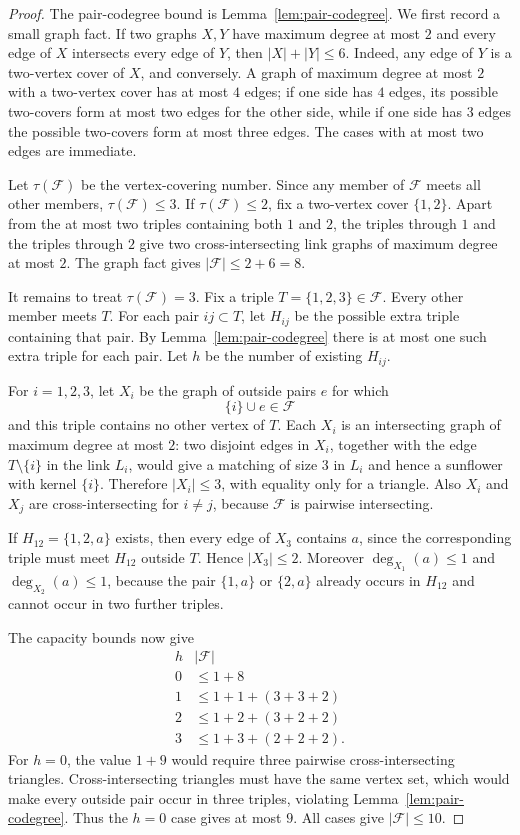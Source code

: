 \documentclass[11pt]{article}
\newcommand{\F}{\mathcal F}
\begin{document}
\begin{proof}
The pair-codegree bound is Lemma~\ref{lem:pair-codegree}.  We first record a
small graph fact.  If two graphs $X,Y$ have maximum degree at most $2$ and
every edge of $X$ intersects every edge of $Y$, then $|X|+|Y|\le 6$.  Indeed,
any edge of $Y$ is a two-vertex cover of $X$, and conversely.  A graph of
maximum degree at most $2$ with a two-vertex cover has at most $4$ edges; if
one side has $4$ edges, its possible two-covers form at most two edges for
the other side, while if one side has $3$ edges the possible two-covers form
at most three edges.  The cases with at most two edges are immediate.

Let $\tau(\F)$ be the vertex-covering number.  Since any member of $\F$ meets
all other members, $\tau(\F)\le 3$.  If $\tau(\F)\le 2$, fix a two-vertex
cover $\{1,2\}$.  Apart from the at most two triples containing both $1$ and
$2$, the triples through $1$ and the triples through $2$ give two
cross-intersecting link graphs of maximum degree at most $2$.  The graph fact
gives $|\F|\le 2+6=8$.

It remains to treat $\tau(\F)=3$.  Fix a triple $T=\{1,2,3\}\in\F$.  Every
other member meets $T$.  For each pair $ij\subset T$, let $H_{ij}$ be the
possible extra triple containing that pair.  By Lemma~\ref{lem:pair-codegree}
there is at most one such extra triple for each pair.  Let $h$ be the number
of existing $H_{ij}$.

For $i=1,2,3$, let $X_i$ be the graph of outside pairs $e$ for which
\[
  \{i\}\cup e\in\F
\]
and this triple contains no other vertex of $T$.  Each $X_i$ is an
intersecting graph of maximum degree at most $2$: two disjoint edges in
$X_i$, together with the edge $T\setminus\{i\}$ in the link $L_i$, would give
a matching of size $3$ in $L_i$ and hence a sunflower with kernel $\{i\}$.
Therefore $|X_i|\le 3$, with equality only for a triangle.  Also $X_i$ and
$X_j$ are cross-intersecting for $i\ne j$, because $\F$ is pairwise
intersecting.

If $H_{12}=\{1,2,a\}$ exists, then every edge of $X_3$ contains $a$, since
the corresponding triple must meet $H_{12}$ outside $T$.  Hence
$|X_3|\le 2$.  Moreover $\deg_{X_1}(a)\le 1$ and $\deg_{X_2}(a)\le 1$,
because the pair $\{1,a\}$ or $\{2,a\}$ already occurs in $H_{12}$ and cannot
occur in two further triples.

The capacity bounds now give
\[
\begin{array}{c|c}
h& |\F|\\ \hline
0& \le 1+8\\
1& \le 1+1+(3+3+2)\\
2& \le 1+2+(3+2+2)\\
3& \le 1+3+(2+2+2).
\end{array}
\]
For $h=0$, the value $1+9$ would require three pairwise cross-intersecting
triangles.  Cross-intersecting triangles must have the same vertex set, which
would make every outside pair occur in three triples, violating
Lemma~\ref{lem:pair-codegree}.  Thus the $h=0$ case gives at most $9$.
All cases give $|\F|\le 10$.


\end{proof}
\end{document}
